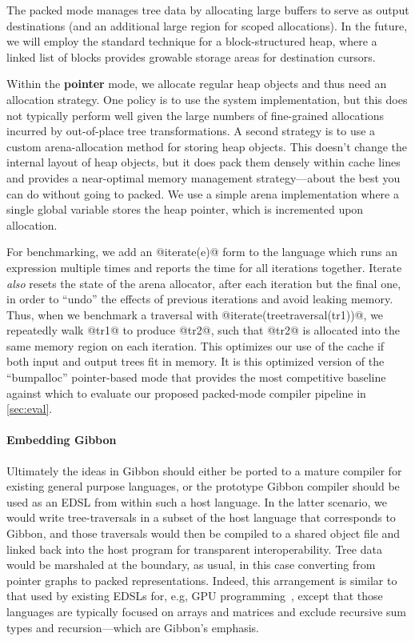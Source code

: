 \documentclass[a4paper,english]{lipics-v2016}
\newcommand{\treelang}{Gibbon\xspace} %
\begin{document}
The packed mode manages tree data by allocating large buffers to serve as output
destinations (and an additional large region for scoped allocations).  In the
future, we will employ the standard technique for a block-structured heap, where a
linked list of blocks provides growable storage areas for destination cursors.


Within the {\bf pointer} mode, we allocate regular heap objects and thus need an
allocation strategy.  One policy is to use the system 
implementation, but this does not typically perform well given the large numbers
of fine-grained allocations incurred by out-of-place tree transformations.
%
A second strategy is to use a custom arena-allocation method for storing heap
objects.  This doesn't change the internal layout of heap objects, but it does
pack them densely within cache lines and provides a near-optimal memory
management strategy---about the best you can do without going to packed.
%
We use a simple arena implementation where a single global variable stores the
heap pointer, which is incremented upon allocation.

For benchmarking, we add an @iterate(e)@ form to the language which runs an
expression multiple times and reports the time for all iterations together.
Iterate {\em also} resets the state of the arena allocator, after each iteration
but the final one, in order to ``undo'' the effects of previous iterations
and avoid leaking memory.
%
Thus, when we benchmark a traversal with @iterate(treetraversal(tr1))@, we
repeatedly walk @tr1@ to produce @tr2@, such that @tr2@ is allocated into the
same memory region on each iteration.  This optimizes our use of the cache if
both input and output trees fit in memory.
%
It is this optimized version of the ``bumpalloc'' pointer-based mode that
provides the most competitive baseline against which to evaluate our proposed
packed-mode compiler pipeline in \cref{sec:eval}.


\paragraph*{Embedding Gibbon}

Ultimately the ideas in Gibbon should either be ported to a mature compiler for
existing general purpose languages, or the prototype Gibbon compiler should be
used as an EDSL from within such a host language.
%
In the latter scenario, we would write tree-traversals in a subset of the host
language that corresponds to Gibbon, and those traversals would then be compiled
to a shared object file and linked back into the host program for transparent
interoperability.  Tree data would be marshaled at the boundary, as usual, in
this case converting from pointer graphs to packed representations.
%
Indeed, this arrangement is similar to that used by existing EDSLs for, e.g, GPU
programming~\cite{accelerate-icfp13,delite,obsidian-cacm}, except that those languages are
typically focused on arrays and matrices and exclude recursive sum types and
recursion---which are \treelang's emphasis.
\end{document}
